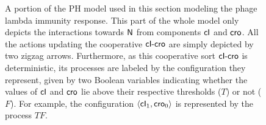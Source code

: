 \begin{figure}[p]
{
}
\caption{\label{fig:phage-lambda-cIcro-N}%
  A portion of the PH model used in this section modeling the phage lambda immunity response.
  This part of the whole model only depicts the interactions towards $\mathsf{N}$ from components
  $\mathsf{cI}$ and $\mathsf{cro}$.
  All the actions updating the cooperative $\mathsf{cI\mbox{-}cro}$ are simply depicted by two
  zigzag arrows.
  Furthermore, as this cooperative sort $\mathsf{cI\mbox{-}cro}$ is deterministic,
  its processes are labeled by the configuration they represent,
  given by two Boolean variables indicating whether
  the values of $\mathsf{cI}$ and $\mathsf{cro}$ lie above their respective thresholds ($T$) or not ($F$).
  For example, the configuration $\langle \mathsf{cI}_1, \mathsf{cro}_0 \rangle$ is represented by the process $TF$.
}
\end{figure}


